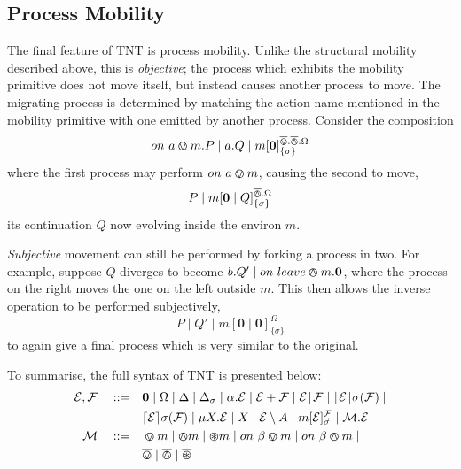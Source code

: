 \documentclass{sig-alternate}
\newcommand{\expr}{\text{$\mathcal{E}$}}
\newcommand{\exprb}{\text{$\mathcal{F}$}}
\newcommand{\ambop}{\text{$\mathcal{M}$}}
\newcommand{\nil}{\textbf{0}}
\newcommand{\res}[1]{\setminus {#1}}
\newcommand{\timeout}[3]{\lfloor{#1}\rfloor {#2} ({#3})}
\newcommand{\stimeout}[3]{\lceil{#1}\rceil {#2} ({#3})}
\newcommand{\loc}[4]{{#1}[ #2 ]^{#3}_{\{#4\}}}
\newcommand{\locv}[4]{{#1}[ #2 ]^{#3}_{#4}}
\newcommand{\procin}[2]{on\ #1 \tntin{#2}}
\newcommand{\procout}[2]{on\ #1 \tntout{#2}}
\newcommand{\bin}{\overline{\varovee}}
\newcommand{\bout}{\overline{\varowedge}}
\newcommand{\bopen}{\overline{\varoast}}
\newcommand{\tntin}[1]{\tin #1}
\newcommand{\tntout}[1]{\tout #1}
\newcommand{\tntopen}[1]{\topen #1}
\newcommand{\tin}{\varovee}
\newcommand{\tout}{\varowedge}
\newcommand{\topen}{\varoast}
\newcommand{\pc}{\mid}
\begin{document}
\subsection{Process Mobility}
\label{procmob}

The final feature of TNT is process mobility. Unlike the structural
mobility described above, this is \emph{objective}; the process which
exhibits the mobility primitive does not move itself, but instead causes
another process to move.  The migrating process is determined by
matching the action name mentioned in the mobility primitive with one
emitted by another process.  Consider the composition
\begin{displaymath}
  \procin{a}{m}.P \mid a.Q \mid \loc{m}{\nil}{\bin.\bout.\Omega}{\sigma}
\end{displaymath}
where the first process may perform $\procin{a}{m}$, causing the second
to move,
\begin{displaymath}
P \mid \loc{m}{\nil \mid Q}{\bout.\Omega}{\sigma}
\end{displaymath}
its continuation $Q$ now evolving inside the environ $m$.

\emph{Subjective} movement can still be performed by forking a process
in two. For example, suppose $Q$ diverges to become $b.Q' \mid
\procout{leave}{m}.\nil$, where the process on the right moves the one
on the left outside $m$. This then allows the inverse operation to be
performed subjectively,
\begin{displaymath}
P \mid Q' \mid \loc{m}{\nil \pc \nil}{\Omega}{\sigma}
\end{displaymath}
to again give a final process which is very similar to the original.

To summarise, the full syntax of TNT is presented below:
\begin{equation*}
  \begin{aligned}
    \expr, \exprb \quad \mathrel{::=} \quad &
      \nil  \mid
      \Omega \mid
      \Delta \mid
      \Delta_{\sigma} \mid
      \alpha . \expr  \mid
      \expr + \exprb \mid
      \expr \mathrel{\!|\!} \exprb \mid
      \timeout{\expr}{\sigma}{\exprb} \mid \\
    & \stimeout{\expr}{\sigma}{\exprb} \mid 
      \mu X . \expr \mid
      X \mid 
      \expr \res{A} \mid
      \locv{m}{\expr}{\exprb}{\vec{\sigma}} \mid
      \ambop . \expr \\
   \ambop \quad \mathrel{::=} \quad & \tntin{m} \mid \tntout{m} \mid \tntopen{m} \mid
      \procin{\beta}{m} \mid \procout{\beta}{m} \mid \\
   & \bin \mid \bout \mid \bopen
   \end{aligned}
\end{equation*}
\end{document}
